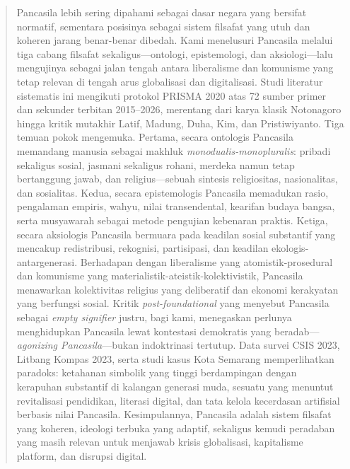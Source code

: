 \documentclass[journal]{IEEEtran}
\begin{document}
\begin{abstract}
Pancasila lebih sering dipahami sebagai dasar negara yang bersifat normatif, sementara posisinya sebagai sistem filsafat yang utuh dan koheren jarang benar-benar dibedah. Kami menelusuri Pancasila melalui tiga cabang filsafat sekaligus---ontologi, epistemologi, dan aksiologi---lalu mengujinya sebagai jalan tengah antara liberalisme dan komunisme yang tetap relevan di tengah arus globalisasi dan digitalisasi. Studi literatur sistematis ini mengikuti protokol PRISMA 2020 atas 72 sumber primer dan sekunder terbitan 2015--2026, merentang dari karya klasik Notonagoro hingga kritik mutakhir Latif, Madung, Duha, Kim, dan Pristiwiyanto. Tiga temuan pokok mengemuka. Pertama, secara ontologis Pancasila memandang manusia sebagai makhluk \textit{monodualis-monopluralis}: pribadi sekaligus sosial, jasmani sekaligus rohani, merdeka namun tetap bertanggung jawab, dan religius---sebuah sintesis religiositas, nasionalitas, dan sosialitas. Kedua, secara epistemologis Pancasila memadukan rasio, pengalaman empiris, wahyu, nilai transendental, kearifan budaya bangsa, serta musyawarah sebagai metode pengujian kebenaran praktis. Ketiga, secara aksiologis Pancasila bermuara pada keadilan sosial substantif yang mencakup redistribusi, rekognisi, partisipasi, dan keadilan ekologis-antargenerasi. Berhadapan dengan liberalisme yang atomistik-prosedural dan komunisme yang materialistik-ateistik-kolektivistik, Pancasila menawarkan kolektivitas religius yang deliberatif dan ekonomi kerakyatan yang berfungsi sosial. Kritik \textit{post-foundational} yang menyebut Pancasila sebagai \textit{empty signifier} justru, bagi kami, menegaskan perlunya menghidupkan Pancasila lewat kontestasi demokratis yang beradab---\textit{agonizing Pancasila}---bukan indoktrinasi tertutup. Data survei CSIS 2023, Litbang Kompas 2023, serta studi kasus Kota Semarang memperlihatkan paradoks: ketahanan simbolik yang tinggi berdampingan dengan kerapuhan substantif di kalangan generasi muda, sesuatu yang menuntut revitalisasi pendidikan, literasi digital, dan tata kelola kecerdasan artifisial berbasis nilai Pancasila. Kesimpulannya, Pancasila adalah sistem filsafat yang koheren, ideologi terbuka yang adaptif, sekaligus kemudi peradaban yang masih relevan untuk menjawab krisis globalisasi, kapitalisme platform, dan disrupsi digital.
\end{abstract}
\end{document}

